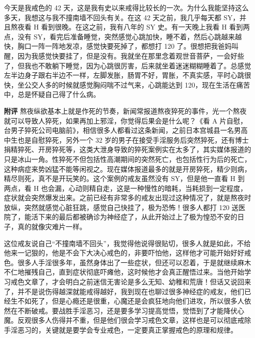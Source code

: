 \begin{case}
    今天是我戒色的 42 天，这是我有史以来戒得比较长的一次。为什么我能坚持这么多天，我想这与我不撞南墙不回头有关。在这 42 天之前，我几乎每天都 SY，并且熬夜看 H 看到很晚。在这之前，我有八年的 SY 史。有一天晚上我看 H 看到两点，没有 SY，看完后准备睡觉，突然感觉心跳加快，睡不着，然后心跳越来越快，胸口一阵一阵地发凉，感觉快要死掉了，都想打 120 了。很想把我爸妈叫醒，因为我感觉快要挂了，但是没有。我就坐在那里念着观世音菩萨，一会好些了，但我也不敢躺下睡觉，因为心跳很厉害，后来就坐着迷迷糊糊睡着了。总感觉左半边身子跟右半边不一样，左脚发胀，肠胃不好，胃胀，不真实感，平时心跳很快，坐公交人多的时候就感觉胸闷喘不过气来，心跳能达到 120，现在生活在痛苦中，总是怀疑自己得了什么病。

    \textbf{附评} 熬夜纵欲基本上就是作死的节奏，新闻常报道熬夜猝死的事件，光一个熬夜就可以导致人猝死，如果再加上邪淫，你觉得后果会是什么呢？《看 A 片自慰，台男子猝死公司电脑前》，相信很多人都看过这条新闻，之前日本宫城县一名男高中生也是自慰猝死，另外一个 32 岁的男子在接受手淫服务后突然猝死，还有博士捐精猝死、开房猝死等，这类大泄身导致的猝死案例实在太多了，其实媒体报道的只是冰山一角。性猝死不但包括性高潮期间的突然死亡，也包括性行为后的死亡，这种病症来势凶猛不能等闲视之。现在媒体报道最多的就是开房猝死，精少则病，精尽则死，真不是开玩笑的。这个案例的戒友虽然没有 SY，但是他一直看 H 到两点，看 H 也会漏，心动则精自走，这是一种慢性的暗耗，当耗损到一定程度，症状就会突然爆发出来。之前已经有非常多的戒友出现过这种情况了，就是熬夜时放纵，突然就感觉心脏狂跳，感觉自己快挂了，极为恐怖！很多人都打 120 送医院了，能活下来的最后都被确诊为神经症了，从此开始过上了极为惶恐不安的日子，真的就像灾难片一样。

    这位戒友说自己“不撞南墙不回头”，我觉得他说得很贴切，很多人就是如此，不给他来一记狠的，他是不会下大决心戒色的，非要吓怕他，这样他才可能开始好好戒色。很多人手淫很多年，虽然身体出了一些症状，但还可以忍着，于是就继续麻木不仁地摧残自己，直到症状彻底吓瘫他，这时候他才会真正醒悟过来。当他开始学习戒色文章了，才会明白之前迷信无害论是多么无知、幼稚和荒唐！但话又说回来了，并不是说伤得越深就能戒得越好，我到现在也聊过很多神经症的戒友，他们已经生不如死了，但是心瘾还是很重，心魔还是会疯狂地向他们进攻，所以很多人依然在不断破戒。要战胜手淫恶习，还是要多学习提高觉悟，觉悟到了才能降伏心魔。反观很多人伤得并不重，但是他们很会学习戒色文章，这样也是可以彻底戒除手淫恶习的，关键就是要学会专业戒色，一定要真正掌握戒色的原理和规律。
\end{case}

